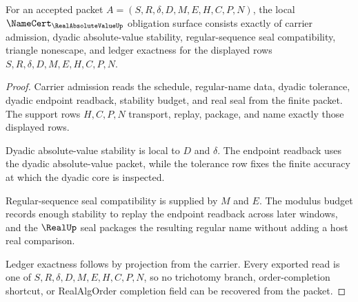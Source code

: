\begin{theorem}
\label{thm:real-absolute-value-namecert-obligations}
For an accepted packet $A=(S,R,\delta,D,M,E,H,C,P,N)$, the local $\NameCert_{\RealAbsoluteValueUp}$ obligation surface consists exactly of carrier admission, dyadic absolute-value stability, regular-sequence seal compatibility, triangle nonescape, and ledger exactness for the displayed rows $S,R,\delta,D,M,E,H,C,P,N$.
\end{theorem}
\begin{proof}
Carrier admission reads the schedule, regular-name data, dyadic tolerance, dyadic endpoint readback, stability budget, and real seal from the finite packet. The support rows $H,C,P,N$ transport, replay, package, and name exactly those displayed rows.

Dyadic absolute-value stability is local to $D$ and $\delta$. The endpoint readback uses the dyadic absolute-value packet, while the tolerance row fixes the finite accuracy at which the dyadic core is inspected.

Regular-sequence seal compatibility is supplied by $M$ and $E$. The modulus budget records enough stability to replay the endpoint readback across later windows, and the $\RealUp$ seal packages the resulting regular name without adding a host real comparison.

Ledger exactness follows by projection from the carrier. Every exported read is one of $S,R,\delta,D,M,E,H,C,P,N$, so no trichotomy branch, order-completion shortcut, or RealAlgOrder completion field can be recovered from the packet.
\end{proof}

